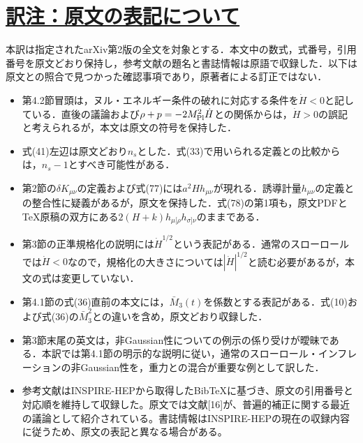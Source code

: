 \documentclass[a4paper,11pt]{ltjsarticle}
\begin{document}
\section*{\hyperlink{toc}{訳注：原文の表記について}}
本訳は指定されたarXiv第2版の全文を対象とする．本文中の数式，式番号，引用番号を原文どおり保持し，参考文献の題名と書誌情報は原語で収録した．以下は原文との照合で見つかった確認事項であり，原著者による訂正ではない．
\begin{itemize}
\item 第4.2節冒頭は，ヌル・エネルギー条件の破れに対応する条件を$\dot H<0$と記している．直後の議論および$\rho+p=-2M_{\rm Pl}^2\dot H$との関係からは，$\dot H>0$の誤記と考えられるが，本文は原文の符号を保持した．
\item 式(41)左辺は原文どおり$n_s$とした．式(33)で用いられる定義との比較からは，$n_s-1$とすべき可能性がある．
\item 第2節の$\delta K_{\mu\nu}$の定義および式(77)には$a^2Hh_{\mu\nu}$が現れる．誘導計量$h_{\mu\nu}$の定義との整合性に疑義があるが，原文を保持した．式(78)の第1項も，原文PDFとTeX原稿の双方にある$2(H+k)h_{\mu[\rho}h_{\sigma]\nu}$のままである．
\item 第3節の正準規格化の説明には$\dot H^{1/2}$という表記がある．通常のスローロールでは$\dot H<0$なので，規格化の大きさについては$|\dot H|^{1/2}$と読む必要があるが，本文の式は変更していない．
\item 第4.1節の式(36)直前の本文には，$\bar M_3(t)$を係数とする表記がある．式(10)および式(36)の$\bar M_3^2$との違いを含め，原文どおり収録した．
\item 第3節末尾の英文は，非Gaussian性についての例示の係り受けが曖昧である．本訳では第4.1節の明示的な説明に従い，通常のスローロール・インフレーションの非Gaussian性を，重力との混合が重要な例として訳した．
\item 参考文献はINSPIRE-HEPから取得したBibTeXに基づき、原文の引用番号と対応順を維持して収録した。原文では文献[16]が、普遍的補正に関する最近の議論として紹介されている。書誌情報はINSPIRE-HEPの現在の収録内容に従うため、原文の表記と異なる場合がある。
\end{itemize}
\end{document}
